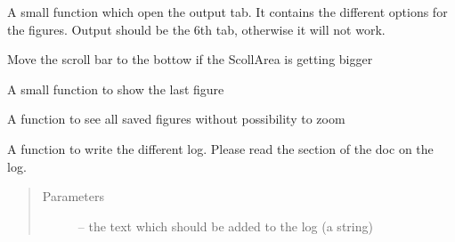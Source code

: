 \documentclass[letterpaper,10pt,english]{sphinxmanual}
\begin{document}
\begin{fulllineitems}

\begin{fulllineitems}
\label{\detokenize{index:src_GUI.Main_windows_1.CentralW.optfig}}
A small function which open the output tab. It contains the different options for the figures.
Output should be the 6th tab, otherwise it will not work.

\end{fulllineitems}


\begin{fulllineitems}
\label{\detokenize{index:src_GUI.Main_windows_1.CentralW.scrolldown}}
Move the scroll bar to the bottow if the ScollArea is getting bigger

\end{fulllineitems}


\begin{fulllineitems}
\label{\detokenize{index:src_GUI.Main_windows_1.CentralW.showfig}}
A small function to show the last figure

\end{fulllineitems}


\begin{fulllineitems}
\label{\detokenize{index:src_GUI.Main_windows_1.CentralW.showfig2}}
A function to see all saved figures without possibility to zoom

\end{fulllineitems}


\begin{fulllineitems}
\label{\detokenize{index:src_GUI.Main_windows_1.CentralW.write_log}}
A function to write the different log. Please read the section of the doc on the log.
\begin{quote}\begin{description}
\item[{Parameters}] \leavevmode
{} -- the text which should be added to the log (a string)


\end{description}
\end{quote}
\end{fulllineitems}
\end{fulllineitems}
\end{document}
